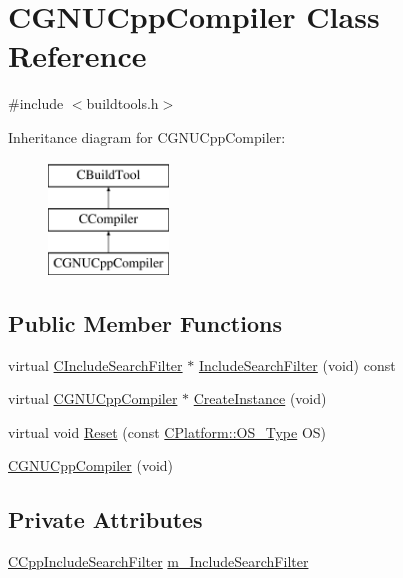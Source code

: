 \hypertarget{classCGNUCppCompiler}{\section{C\-G\-N\-U\-Cpp\-Compiler Class Reference}
\label{classCGNUCppCompiler}
}


{\ttfamily \#include $<$buildtools.\-h$>$}

Inheritance diagram for C\-G\-N\-U\-Cpp\-Compiler\-:\begin{figure}[H]
\begin{center}
\leavevmode
\includegraphics[height=3.000000cm]{d3/d68/classCGNUCppCompiler}
\end{center}
\end{figure}
\subsection*{Public Member Functions}
\begin{DoxyCompactItemize}
\item 
virtual \hyperlink{classCIncludeSearchFilter}{C\-Include\-Search\-Filter} $\ast$ \hyperlink{classCGNUCppCompiler_a70e0a0d27cded35b66807d8e2804ade8}{Include\-Search\-Filter} (void) const 
\item 
virtual \hyperlink{classCGNUCppCompiler}{C\-G\-N\-U\-Cpp\-Compiler} $\ast$ \hyperlink{classCGNUCppCompiler_a0e6856b3906b6b32951f9796fba16316}{Create\-Instance} (void)
\item 
virtual void \hyperlink{classCGNUCppCompiler_ae44ff252152bc51ef1855cc863cb007b}{Reset} (const \hyperlink{classCPlatform_a2fb735c63c53052f79629e338bb0f535}{C\-Platform\-::\-O\-S\-\_\-\-Type} O\-S)
\item 
\hyperlink{classCGNUCppCompiler_a46be2f17939ca4705604ec65b6d3e16d}{C\-G\-N\-U\-Cpp\-Compiler} (void)
\end{DoxyCompactItemize}
\subsection*{Private Attributes}
\begin{DoxyCompactItemize}
\item 
\hyperlink{classCCppIncludeSearchFilter}{C\-Cpp\-Include\-Search\-Filter} \hyperlink{classCGNUCppCompiler_a51684849a7c0aabaa0c780eb06908fb4}{m\-\_\-\-Include\-Search\-Filter}
\end{DoxyCompactItemize}
